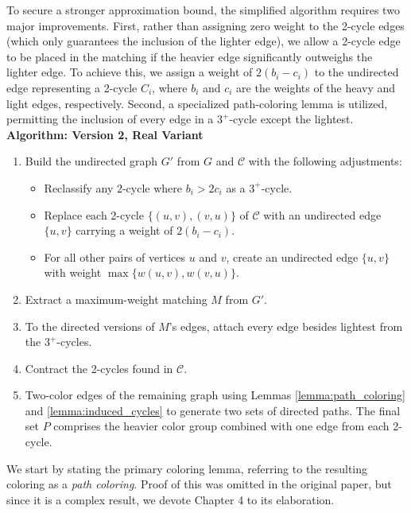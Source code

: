 To secure a stronger approximation bound, the simplified algorithm requires two major improvements. First, rather than assigning zero weight to the 2-cycle edges (which only guarantees the inclusion of the lighter edge), we allow a 2-cycle edge to be placed in the matching if the heavier edge significantly outweighs the lighter edge. To achieve this, we assign a weight of $2(b_i - c_i)$ to the undirected edge representing a 2-cycle $C_i$, where $b_i$ and $c_i$ are the weights of the heavy and light edges, respectively. Second, a specialized path-coloring lemma is utilized, permitting the inclusion of every edge in a $3^+$-cycle except the lightest.\\
\vspace{0.5em}
\noindent\textbf{Algorithm: Version 2, Real Variant}
\begin{enumerate}[label=\textbf{Step 2\alph*.}, leftmargin=*]
    \item Build the undirected graph $G'$ from $G$ and $\mathcal{C}$ with the
    following adjustments:
    \begin{itemize}
        \item Reclassify any 2-cycle where $b_i > 2c_i$ as a $3^+$-cycle.
        \item Replace each 2-cycle $\{(u, v), (v, u)\}$ of $\mathcal{C}$ with an
        undirected edge $\{u, v\}$ carrying a weight of $2(b_i - c_i)$.
        \item For all other pairs of vertices $u$ and $v$, create an undirected
        edge $\{u, v\}$ with weight $\max\{w(u, v), w(v, u)\}$.
    \end{itemize}
    \item Extract a maximum-weight matching $M$ from $G'$.
    \item To the directed versions of $M$'s edges, attach every edge besides
    lightest from the $3^+$-cycles.
    \item Contract the 2-cycles found in $\mathcal{C}$.
    \item Two-color edges of the remaining graph using Lemmas
    \ref{lemma:path_coloring} and \ref{lemma:induced_cycles} to generate two
    sets of directed paths. The final set $P$ comprises the heavier color group
    combined with one edge from each 2-cycle.
\end{enumerate}
\vspace{0.5em}

We start by stating the primary coloring lemma, referring to the resulting
coloring as a \textit{path coloring}. Proof of this was omitted in the original
paper, but since it is a complex result, we devote Chapter 4 to its elaboration.

